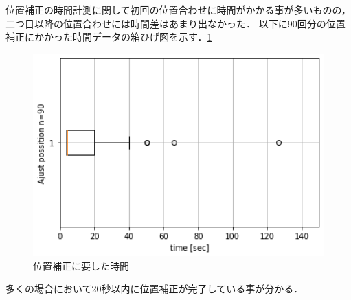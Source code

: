 位置補正の時間計測に関して初回の位置合わせに時間がかかる事が多いものの，二つ目以降の位置合わせには時間差はあまり出なかった．
以下に90回分の位置補正にかかった時間データの箱ひげ図を示す．\ref{postime_plot}

\begin{figure}[htbp]
    \begin{center}
      \includegraphics[clip,width=15.0cm]{img/timedata.png}
      \caption{位置補正に要した時間}
      \label{postime_plot}
    \end{center}
  \end{figure}

  多くの場合において20秒以内に位置補正が完了している事が分かる．